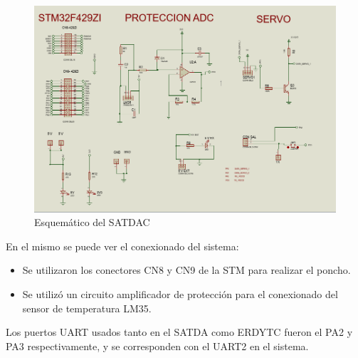 \documentclass[conference]{IEEEtran}
\begin{document}
\begin{figure}[htbp]
\centering
\includegraphics[width=.9\linewidth]{../../images/cuboEsquematico.png}
\caption{\label{fig:cuboEsquematico}Esquemático del SATDAC}
\end{figure}

En el mismo se puede ver el conexionado del sistema:

\begin{itemize}
\item Se utilizaron los conectores CN8 y CN9 de la STM para realizar el poncho.
\item Se utilizó un circuito amplificador de protección para el conexionado del sensor de temperatura LM35.
\end{itemize}

Los puertos UART usados tanto en el SATDA como ERDYTC fueron el PA2 y PA3 respectivamente, y se corresponden con el UART2 en el sistema.
\end{document}
